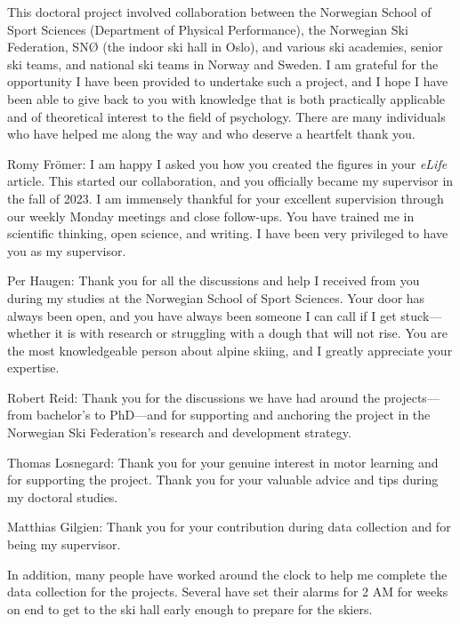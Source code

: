\setlength{\parindent}{0pt} %
\setlength{\parskip}{1em}   %


This doctoral project involved collaboration between the Norwegian School of Sport Sciences (Department of Physical Performance), the Norwegian Ski Federation, SNØ (the indoor ski hall in Oslo), and various ski academies, senior ski teams, and national ski teams in Norway and Sweden. I am grateful for the opportunity I have been provided to undertake such a project, and I hope I have been able to give back to you with knowledge that is both practically applicable and of theoretical interest to the field of psychology. There are many individuals who have helped me along the way and who deserve a heartfelt thank you.

Romy Frömer: I am happy I asked you how you created the figures in your \textit{eLife} article. This started our collaboration, and you officially became my supervisor in the fall of 2023. I am immensely thankful for your excellent supervision through our weekly Monday meetings and close follow-ups. You have trained me in scientific thinking, open science, and writing. I have been very privileged to have you as my supervisor.

Per Haugen: Thank you for all the discussions and help I received from you during my studies at the Norwegian School of Sport Sciences. Your door has always been open, and you have always been someone I can call if I get stuck—whether it is with research or struggling with a dough that will not rise. You are the most knowledgeable person about alpine skiing, and I greatly appreciate your expertise.

Robert Reid: Thank you for the discussions we have had around the projects—from bachelor's to PhD—and for supporting and anchoring the project in the Norwegian Ski Federation's research and development strategy.

Thomas Losnegard: Thank you for your genuine interest in motor learning and for supporting the project. Thank you for your valuable advice and tips during my doctoral studies.

Matthias Gilgien: Thank you for your contribution during data collection and for being my supervisor.

In addition, many people have worked around the clock to help me complete the data collection for the projects. Several have set their alarms for 2 AM for weeks on end to get to the ski hall early enough to prepare for the skiers.

